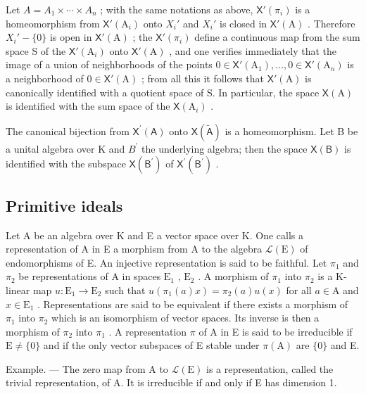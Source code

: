 Let \(A = A_{1} \times \cdots \times A_{n}\) ; with the same notations as above, \(\mathsf{X}'(\pi_{i})\) is a homeomorphism from \(\mathsf{X}'(\mathrm{A}_{i})\) onto \(X_{i}'\) and \(X_{i}'\) is closed in \(\mathsf{X}'(\mathrm{A})\) . Therefore \(X_{i}' - \{0\}\) is open in \(\mathsf{X}'(\mathrm{A})\) ; the \(\mathsf{X}'(\pi_{i})\) define a continuous map from the sum space S of the \(\mathsf{X}'(\mathrm{A}_{i})\) onto \(\mathsf{X}'(\mathrm{A})\) , and one verifies immediately that the image of a union of neighborhoods of the points \(0 \in \mathsf{X}'(\mathrm{A}_{1}), \ldots, 0 \in \mathsf{X}'(\mathrm{A}_{n})\) is a neighborhood of \(0 \in \mathsf{X}'(\mathrm{A})\) ; from all this it follows that \(\mathsf{X}'(\mathrm{A})\) is canonically identified with a quotient space of S. In particular, the space \(\mathsf{X}(\mathrm{A})\) is identified with the sum space of the \(\mathsf{X}(\mathrm{A}_{i})\) .

The canonical bijection from \(\mathsf{X}^{\prime}(\mathsf{A})\) onto \(\mathsf{X}(\tilde{\mathsf{A}})\) is a homeomorphism. Let B be a unital algebra over K and \(B^{\prime}\) the underlying algebra; then the space \(\mathsf{X}(\mathsf{B})\) is identified with the subspace \(\mathsf{X}(\mathsf{B}^{\prime})\) of \(\mathsf{X}^{\prime}(\mathsf{B}^{\prime})\) .

\subsection{Primitive ideals}

Let A be an algebra over K and E a vector space over K. One calls a representation of A in E a morphism from A to the algebra \(\mathcal{L}(\mathrm{E})\) of endomorphisms of E. An injective representation is said to be faithful. Let \(\pi_1\) and \(\pi_2\) be representations of A in spaces \(\mathrm{E}_1\) , \(\mathrm{E}_2\) . A morphism of \(\pi_1\) into \(\pi_2\) is a K-linear map \(u: \mathrm{E}_1 \to \mathrm{E}_2\) such that \(u(\pi_1(a)x) = \pi_2(a)u(x)\) for all \(a \in \mathrm{A}\) and \(x \in \mathrm{E}_1\) . Representations are said to be equivalent if there exists a morphism of \(\pi_1\) into \(\pi_2\) which is an isomorphism of vector spaces. Its inverse is then a morphism of \(\pi_2\) into \(\pi_1\) . A representation \(\pi\) of A in E is said to be irreducible if \(\mathrm{E} \neq \{0\}\) and if the only vector subspaces of E stable under \(\pi(\mathrm{A})\) are \(\{0\}\) and E.

Example. --- The zero map from A to \(\mathcal{L}(\mathrm{E})\) is a representation, called the trivial representation, of A. It is irreducible if and only if E has dimension 1.


